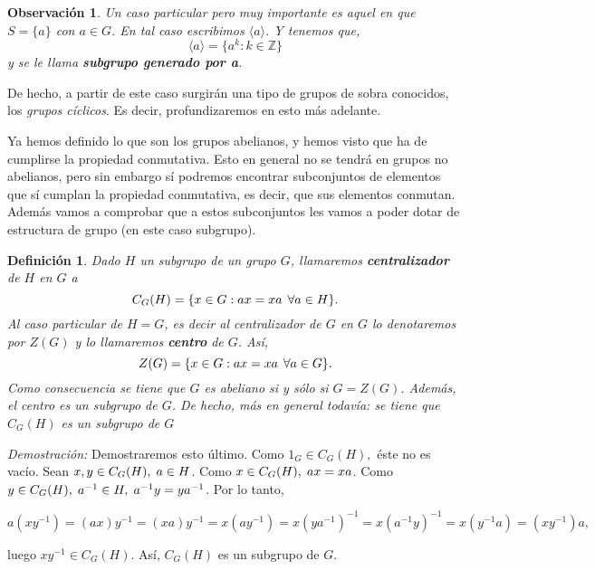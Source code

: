 \documentclass[12pt]{article}
\newtheorem{definition}[theorem]{Definición}
\newtheorem{observation}{Observación}[theorem]
\begin{document}
\begin{observation} Un caso particular pero muy importante es aquel en que $S = \lbrace a \rbrace$ con $a \in G$. En tal caso escribimos $\langle a \rangle$. Y tenemos que, $$\langle a \rangle = \lbrace a^{k} : k \in \mathbb{Z}\rbrace$$ y se le llama \textbf{subgrupo generado por a}.\end{observation}

De hecho, a partir de este caso surgirán una tipo de grupos de sobra conocidos, los \textit{grupos cíclicos}. Es decir, profundizaremos en esto más adelante.

Ya hemos definido lo que son los grupos abelianos, y hemos visto que ha de cumplirse la propiedad conmutativa. Esto en general no se tendrá en grupos no abelianos, pero sin embargo sí podremos encontrar subconjuntos de elementos que sí cumplan la propiedad conmutativa, es decir, que sus elementos conmutan. Además vamos a comprobar que a estos subconjuntos les vamos a poder dotar de estructura de grupo (en este caso subgrupo).

\begin{definition}\label{eq:centro} Dado $H$ un subgrupo de un grupo $G$, llamaremos \textbf{centralizador} de $H$ en $G$ a $$C_{G}(H) = \lbrace x \in G : ax = xa \hspace{0.15cm} \forall a \in H\rbrace.$$
Al caso particular de $H = G$, es decir al centralizador de $G$ en $G$ lo denotaremos por $Z(G)$ y lo llamaremos \textbf{centro} de $G$. Así, $$Z(G) = \lbrace x \in G : ax = xa \hspace{0.15cm} \forall a \in G\rbrace.$$
Como consecuencia se tiene que $G$ es abeliano si y sólo si $G = Z(G)$. Además, el centro es un subgrupo de $G$. De hecho, más en general todavía: se tiene que $C_{G}(H)$ es un subgrupo de $G$
\end{definition}
\emph{Demostración: } Demostraremos esto último. Como $1_{G} \in C_{G}(H),$ éste no es vacío. Sean $x,y \in C_{G}(H),\hspace{0.1cm} a \in H$. Como $x\in C_{G}(H),\hspace{0.1cm} ax = xa$. Como $y \in C_{G}(H), \hspace{0.1cm} a^{-1} \in H,\hspace{0.1cm} a^{-1}y = ya^{-1}$. Por lo tanto, \begin{center}$a(xy^{-1}) = (ax)y^{-1} = (xa)y^{-1} = x(ay^{-1}) = x(ya^{-1})^{-1} = x(a^{-1}y)^{-1} = x(y^{-1}a) = (xy^{-1})a,$\end{center} luego $xy^{-1} \in C_{G}(H)$. Así, $C_{G}(H)$ es un subgrupo de $G$.
\end{document}
